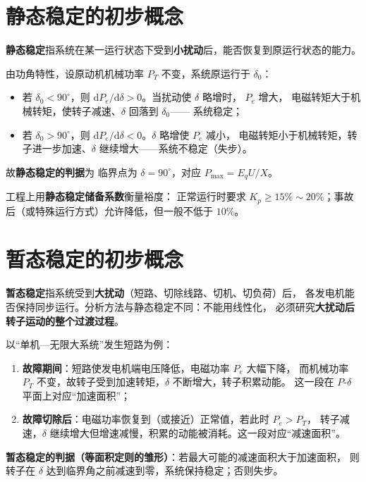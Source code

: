 
\section{静态稳定的初步概念}

\textbf{静态稳定}指系统在某一运行状态下受到\textbf{小扰动}后，能否恢复到原运行状态的能力。

由功角特性，设原动机机械功率 $P_T$ 不变，系统原运行于 $\delta_0$：
\begin{itemize}
  \item 若 $\delta_0<90^\circ$，则 $\mathrm{d}P_e/\mathrm{d}\delta>0$。当扰动使 $\delta$ 略增时，
        $P_e$ 增大， 电磁转矩大于机械转矩，使转子减速、$\delta$ 回落到 $\delta_0$——
        系统稳定；
  \item 若 $\delta_0>90^\circ$，则 $\mathrm{d}P_e/\mathrm{d}\delta<0$。$\delta$ 略增使 $P_e$ 减小，
        电磁转矩小于机械转矩，转子进一步加速、$\delta$ 继续增大——系统不稳定（失步）。
\end{itemize}
故\textbf{静态稳定的判据}为
临界点为 $\delta=90^\circ$，对应 $P_{\max}=E_qU/X$。

工程上用\textbf{静态稳定储备系数}衡量裕度：
正常运行时要求 $K_p\ge15\%\sim20\%$；事故后（或特殊运行方式）允许降低，但一般不低于 $10\%$。

\section{暂态稳定的初步概念}

\textbf{暂态稳定}指系统受到\textbf{大扰动}（短路、切除线路、切机、切负荷）后，
各发电机能否保持同步运行。分析方法与静态稳定不同：不能用线性化，
必须研究\textbf{大扰动后转子运动的整个过渡过程}。

以“单机—无限大系统”发生短路为例：
\begin{enumerate}
  \item \textbf{故障期间}：短路使发电机端电压降低，电磁功率 $P_e$ 大幅下降，
        而机械功率 $P_T$ 不变，故转子受到加速转矩，$\delta$ 不断增大，转子积累动能。
        这一段在 $P$-$\delta$ 平面上对应“加速面积”；
  \item \textbf{故障切除后}：电磁功率恢复到（或接近）正常值，若此时 $P_e>P_T$，
        转子减速，$\delta$ 继续增大但增速减慢，积累的动能被消耗。这一段对应“减速面积”。
\end{enumerate}
\textbf{暂态稳定的判据（等面积定则的雏形）}：若最大可能的减速面积大于加速面积，
则转子在 $\delta$ 达到临界角之前减速到零，系统保持稳定；否则失步。

